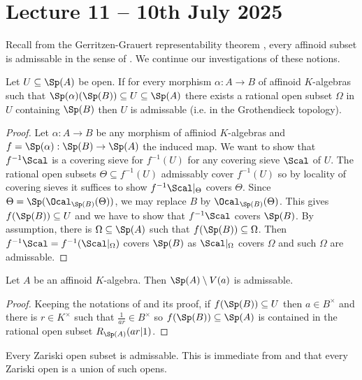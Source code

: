 \section{Lecture 11 -- 10th July 2025}\label{sec: lecture 11}
Recall from the Gerritzen-Grauert representability theorem , every affinoid subset is admissable in the sense of . We continue our investigations of these notions. 
\begin{lemma}\label{lem: sandwich implies admissable}
    Let $U\subseteq\Sp(A)$ be open. If for every morphism $\alpha:A\to B$ of affinoid $K$-algebras such that $\Sp(\alpha)(\Sp(B))\subseteq U\subseteq\Sp(A)$ there exists a rational open subset $\Omega$ in $U$ containing $\Sp(B)$ then $U$ is admissable (i.e. in the Grothendieck topology). 
\end{lemma}
\begin{proof}
    Let $\alpha:A\to B$ be any morphism of affiniod $K$-algebras and $f=\Sp(\alpha):\Sp(B)\to\Sp(A)$ the induced map. We want to show that $f^{-1}\Scal$ is a covering sieve for $f^{-1}(U)$ for any covering sieve $\Scal$ of $U$. The rational open subsets $\Theta\subseteq f^{-1}(U)$ admissably cover $f^{-1}(U)$ so by locality of covering sieves it suffices to show $f^{-1}\Scal|_{\Theta}$ covers $\Theta$. Since $\Theta=\Sp(\Ocal_{\Sp(B)}(\Theta))$, we may replace $B$ by $\Ocal_{\Sp(B)}(\Theta)$. This gives $f(\Sp(B))\subseteq U$ and we have to show that $f^{-1}\Scal$ covers $\Sp(B)$. By assumption, there is $\Omega\subseteq\Sp(A)$ such that $f(\Sp(B))\subseteq\Omega$. Then $f^{-1}\Scal=f^{-1}(\Scal|_{\Omega})$ covers $\Sp(B)$ as $\Scal|_{\Omega}$ covers $\Omega$ and such $\Omega$ are admissable. 
\end{proof}
\begin{lemma}\label{lem: distinguished opens are admissable}
    Let $A$ be an affinoid $K$-algebra. Then $\Sp(A)\setminus V(a)$ is admissable. 
\end{lemma}
\begin{proof}
    Keeping the notations of  and its proof, if $f(\Sp(B))\subseteq U$ then $a\in B^{\times}$ and there is $r\in K^{\times}$ such that $\frac{1}{ar}\in B^{\times}$ so $f(\Sp(B))\subseteq\Sp(A)$ is contained in the rational open subset $R_{\Sp(A)}(ar|1)$. 
\end{proof}
\begin{example}
    Every Zariski open subset is admissable. This is immediate from  and that every Zariski open is a union of such opens. 
\end{example}
